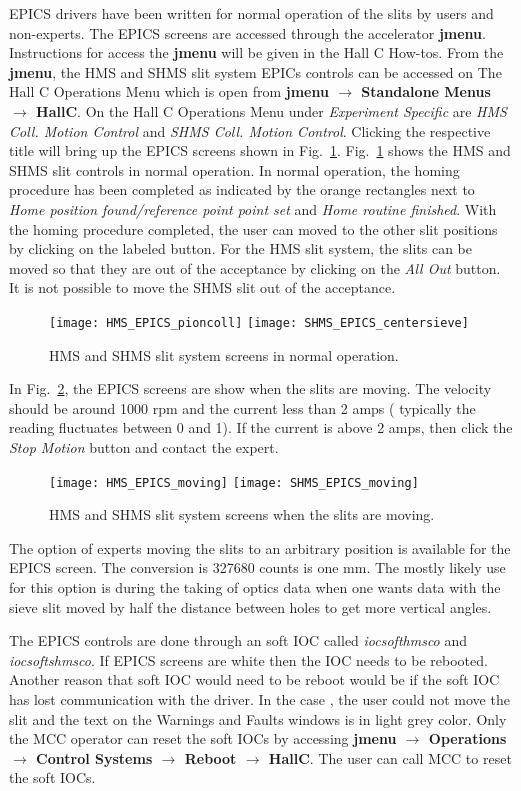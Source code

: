 EPICS drivers have been written for normal operation of the slits by users and non-experts. The
EPICS screens are accessed through the accelerator {\bf jmenu}. Instructions for access the
  {\bf jmenu} will be given in the Hall C How-tos.
From the  {\bf jmenu}, the HMS and SHMS slit system EPICs controls can be accessed on The Hall C Operations Menu
which is open from {\bf jmenu $\rightarrow$ Standalone Menus $\rightarrow$ HallC}. On the Hall C Operations Menu under
{\it Experiment Specific} are {\it HMS Coll. Motion Control} and {\it SHMS Coll. Motion Control}. Clicking the
respective title will bring up the EPICS screens shown in Fig.~\ref{fig:normal-coll-epics}.  Fig.~\ref{fig:normal-coll-epics}
shows the HMS and SHMS slit controls in normal operation. In normal operation, the homing procedure has been completed
as indicated by the orange rectangles next to {\it Home position found/reference point point set} and {\it Home routine finished}.
With the homing procedure completed, the user can moved to the other slit positions by clicking on the labeled button. For the
HMS slit system, the slits can be moved so that they are out of the acceptance by clicking on the {\it All Out} button.
It is not possible to move the SHMS slit out of the acceptance.
\begin{figure}
\texttt{[image: HMS\_EPICS\_pioncoll]}
\texttt{[image: SHMS\_EPICS\_centersieve]}
\caption{HMS and SHMS slit system screens in normal operation. \label{fig:normal-coll-epics}}
\end{figure}
In Fig.~\ref{fig:moving-coll-epics}, the EPICS screens are show when the slits are moving. The velocity should be around 1000 rpm and
the current less than 2 amps ( typically the reading fluctuates between 0 and 1). If the current is above 2 amps,
then click the {\it Stop Motion} button and contact the expert.
\begin{figure}
\texttt{[image: HMS\_EPICS\_moving]}
\texttt{[image: SHMS\_EPICS\_moving]}
\caption{HMS and SHMS slit system screens when the slits are moving. \label{fig:moving-coll-epics}}
\end{figure}
The option of experts moving the slits to an arbitrary position
is available for the EPICS screen. The conversion is 327680 counts is one mm. The mostly likely use for this option is during the
taking of optics data when one wants data with the sieve slit moved by half the distance between holes to get more vertical angles.

The EPICS controls are done through an soft IOC called {\it  iocsofthmsco} and {\it iocsoftshmsco}. If EPICS screens are white then the IOC
needs to be rebooted. Another reason that soft IOC would need to be reboot would be if the soft IOC has lost communication with the driver.
In the case , the user could not move the slit and the text on the Warnings and Faults windows is in light grey color. Only the MCC operator can
reset the soft IOCs by accessing {\bf jmenu $\rightarrow$ Operations $\rightarrow$ Control Systems $\rightarrow$ Reboot $\rightarrow$ HallC}. The user can
call MCC to reset the soft IOCs.

